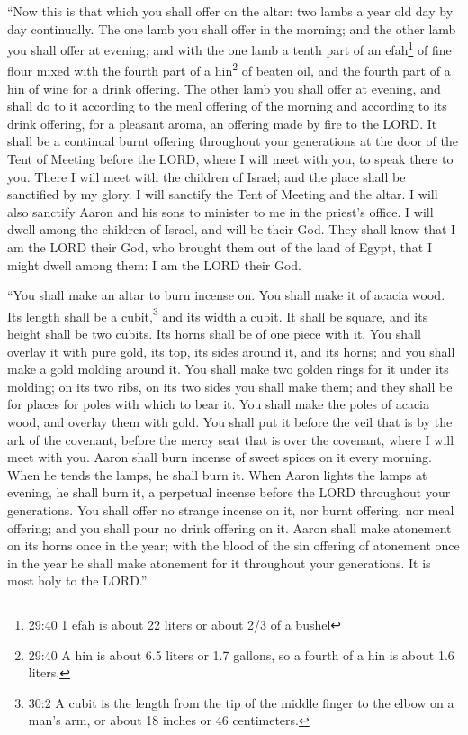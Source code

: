 \myverse{}“Now this is that which you shall offer on the altar: two lambs
a year old day by day continually.
\myverse{}The one lamb you shall offer in the morning; and the other lamb you shall
offer at evening;
\myverse{}and with the one lamb a tenth part of an efah\footnote{29:40 1 efah is about 22 liters or about 2/3 of a bushel} of fine flour mixed with the fourth
part of a hin\footnote{29:40 A hin is about 6.5 liters or 1.7 gallons, so a fourth of a hin is about 1.6 liters.}
of beaten oil, and the fourth part of a hin of wine for a drink offering.
\myverse{}The other lamb you shall offer at evening, and shall do to it according to
the meal offering of the morning and according to its drink offering, for a pleasant aroma, an offering
made by fire to the LORD.
\myverse{}It shall be a continual burnt offering throughout your generations at the
door of the Tent of Meeting before the LORD, where I will meet with you, to speak there to you.
\myverse{}There I will meet with the children of Israel; and the place shall be sanctified
by my glory.
\myverse{}I will sanctify the Tent of Meeting and the altar. I will also sanctify Aaron
and his sons to minister to me in the priest’s office.
\myverse{}I will dwell among the children of Israel, and will be their God.
\myverse{}They shall know that I am the LORD their God, who brought them out of the
land of Egypt, that I might dwell among them: I am the LORD their God.


\mychapter{} \myverse*{}“You shall make an altar to burn incense on. You shall make it
of acacia wood.
\myverse{}Its length shall be a cubit,\footnote{30:2 A cubit is the length from the tip of the middle finger to the elbow on a man’s arm, or about
	18 inches or 46 centimeters.} and its width a cubit. It shall be square, and its height shall
be two cubits. Its horns shall be of one piece with it.
\myverse{}You shall overlay it with pure gold, its top, its sides around it, and its
horns; and you shall make a gold molding around it.
\myverse{}You shall make two golden rings for it under its molding; on its two ribs,
on its two sides you shall make them; and they shall be for places for poles with which to bear it.
\myverse{}You shall make the poles of acacia wood, and overlay them with gold.
\myverse{}You shall put it before the veil that is by the ark of the covenant, before
the mercy seat that is over the covenant, where I will meet with you.
\myverse{}Aaron shall burn incense of sweet spices on it every morning. When he tends
the lamps, he shall burn it.
\myverse{}When Aaron lights the lamps at evening, he shall burn it, a perpetual incense
before the LORD throughout your generations.
\myverse{}You shall offer no strange incense on it, nor burnt offering, nor meal offering;
and you shall pour no drink offering on it.
\myverse{}Aaron shall make atonement on its horns once in the year; with the blood
of the sin offering of atonement once in the year he shall make atonement for it throughout your generations.
It is most holy to the LORD.”


